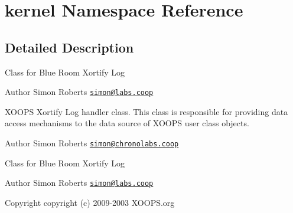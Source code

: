 \hypertarget{namespacekernel}{\section{kernel Namespace Reference}
\label{namespacekernel}
}


\subsection{Detailed Description}
Class for Blue Room Xortify Log \begin{DoxyAuthor}{Author}
Simon Roberts \href{mailto:simon@labs.coop}{\tt simon@labs.\-coop}
\end{DoxyAuthor}
X\-O\-O\-P\-S Xortify Log handler class. This class is responsible for providing data access mechanisms to the data source of X\-O\-O\-P\-S user class objects.

\begin{DoxyAuthor}{Author}
Simon Roberts \href{mailto:simon@chronolabs.coop}{\tt simon@chronolabs.\-coop}
\end{DoxyAuthor}
Class for Blue Room Xortify Log \begin{DoxyAuthor}{Author}
Simon Roberts \href{mailto:simon@labs.coop}{\tt simon@labs.\-coop} 
\end{DoxyAuthor}
\begin{DoxyCopyright}{Copyright}
copyright (c) 2009-\/2003 X\-O\-O\-P\-S.\-org 
\end{DoxyCopyright}
